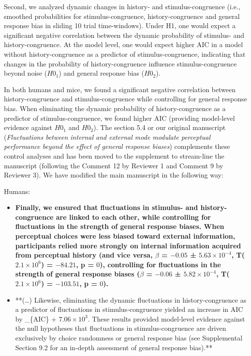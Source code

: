 \documentclass[
]{article}
\begin{document}
Second, we analyzed dynamic changes in history- and stimulus-congruence
(i.e., smoothed probabilities for stimulus-congruence,
history-congruence and general response bias in sliding 10 trial
time-windows). Under H1, one would expect a significant negative
correlation between the dynamic probability of stimulus- and
history-congruence. At the model level, one would expect higher AIC in a
model without history-congruence as a predictor of stimulus-congruence,
indicating that changes in the probability of history-congruence
influence stimulus-congruence beyond noise (\(H0_1\)) and general
response bias (\(H0_2\)).

In both humans and mice, we found a significant negative correlation
between history-congruence and stimulus-congruence while controlling for
general response bias. When eliminating the dynamic probability of
history-congruence as a predictor of stimulus-congruence, we found
higher AIC (providing model-level evidence against \(H0_1\) and
\(H0_2\)). The section 5.4 or our original manuscript
(\emph{Fluctuations between internal and external mode modulate
perceptual performance beyond the effect of general response biases})
complements these control analyses and has been moved to the supplement
to stream-line the manuscript (following the Comment 12 by Reviewer 1
and Comment 9 by Reviewer 3). We have modified the main manuscript in
the following way:

Humans:

\begin{itemize}
\item
  \textbf{Finally, we ensured that fluctuations in stimulus- and
  history-congruence are linked to each other, while controlling for
  fluctuations in the strength of general response biases. When
  perceptual choices were less biased toward external information,
  participants relied more strongly on internal information acquired
  from perceptual history (and vice versa, \(\beta\) = \(-0.05\) ±
  \(\ensuremath{5.63\times 10^{-4}}\),
  T(\(\ensuremath{2.1\times 10^{6}}\)) = \(-84.21\), p = \(0\)),
  controlling for fluctuations in the strength of general response
  biases (\(\beta\) = \(-0.06\) ± \(\ensuremath{5.82\times 10^{-4}}\),
  T(\(\ensuremath{2.1\times 10^{6}}\)) = \(-103.51\), p = \(0\)).}
\item
  **(\ldots) Likewise, eliminating the dynamic fluctuations in
  history-congruence as a predictor of fluctuations in
  stimulus-congruence yielded an increase in AIC by \delta\_\{AIC\} +
  \ensuremath{7.06\times 10^{3}}. These results provided model-level
  evidence against the null hypotheses that fluctuations in
  stimulus-congruence are driven exclusively by choice randomness or
  general response bias (see Supplemental Section 9.2 for an in-depth
  assessment of general response bias).**
\end{itemize}
\end{document}
